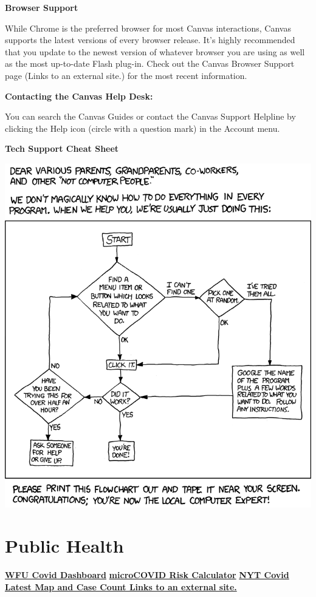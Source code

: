 \textbf{Browser Support}

While Chrome is the preferred browser for most Canvas interactions, Canvas supports the latest versions of every browser release. It's highly recommended that you update to the newest version of whatever browser you are using as well as the most up-to-date Flash plug-in. Check out the Canvas Browser Support page (Links to an external site.) for the most recent information.

\textbf{Contacting the Canvas Help Desk:}

You can search the Canvas Guides or contact the Canvas Support Helpline by clicking the Help icon (circle with a question mark) in the Account menu.

\textbf{Tech Support Cheat Sheet}

\includegraphics[width=10.17in]{img/tech_support_cheat_sheet}

\hypertarget{public-health}{%
\section{Public Health}\label{public-health}}

\textbf{\href{https://ourwayforward.wfu.edu/covid-19-dashboard/}{WFU Covid Dashboard}}
\textbf{\href{https://www.microcovid.org/}{microCOVID Risk Calculator}}
\textbf{\href{https://www.nytimes.com/interactive/2021/us/north-carolina-covid-cases.html}{NYT Covid Latest Map and Case Count Links to an external site.}}

